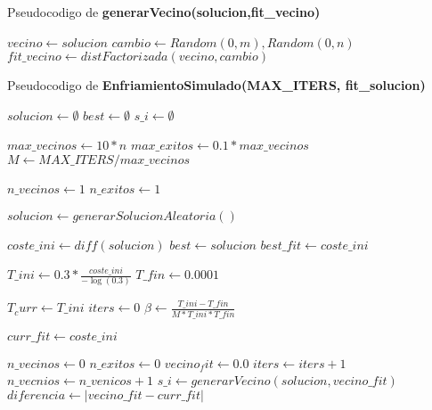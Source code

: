      Pseudocodigo de \textbf{generarVecino(solucion,fit\_vecino)}
     \begin{algorithm}[H]
       \begin{algorithmic}[1]
          \State $vecino \gets solucion$
          \State $cambio \gets Random(0,m), Random(0,n)$ 
          \State $fit\_vecino \gets distFactorizada(vecino, cambio)$
          \State {}
         \EndFunction
       \end{algorithmic}
     \end{algorithm}


     Pseudocodigo de \textbf{EnfriamientoSimulado(MAX\_ITERS, fit\_solucion)}
     \begin{algorithm}[H]
       \begin{algorithmic}[1]
          \State $solucion \gets \emptyset$
          \State $best \gets \emptyset$
          \State $s\_i \gets \emptyset$

          \State $max\_vecinos \gets 10*n$
          \State $max\_exitos \gets 0.1 * max\_vecinos$
          \State $M \gets MAX\_ITERS / max\_vecinos$

          \State $n\_vecinos \gets 1$
          \State $n\_exitos \gets 1$

          \State $solucion \gets generarSolucionAleatoria()$

          \State $coste\_ini \gets  diff(solucion)$ 
          \State $best \gets solucion$
          \State $best\_fit \gets coste\_ini$

          \State $T\_ini \gets 0.3 * \frac{coste\_ini }{-\log(0.3)}$
          \State $T\_fin \gets 0.0001$

          \State $T_curr \gets T\_ini$
          \State $iters \gets 0$
          \State $\beta \gets \frac{T\_ini - T\_fin}{M * T\_ini * T\_fin}$

          \State $curr\_fit \gets coste\_ini$

          \State $n\_vecinos \gets 0$
          \State $n\_exitos \gets 0$
              \State $vecino_fit \gets 0.0$
              \State $iters \gets iters + 1$
              \State $n\_vecnios \gets n\_venicos + 1$
              \State $s\_i \gets generarVecino(solucion,vecino\_fit)$
              \State $diferencia \gets \lvert vecino\_fit - curr\_fit \rvert$


\end{algorithmic}
\end{algorithm}
